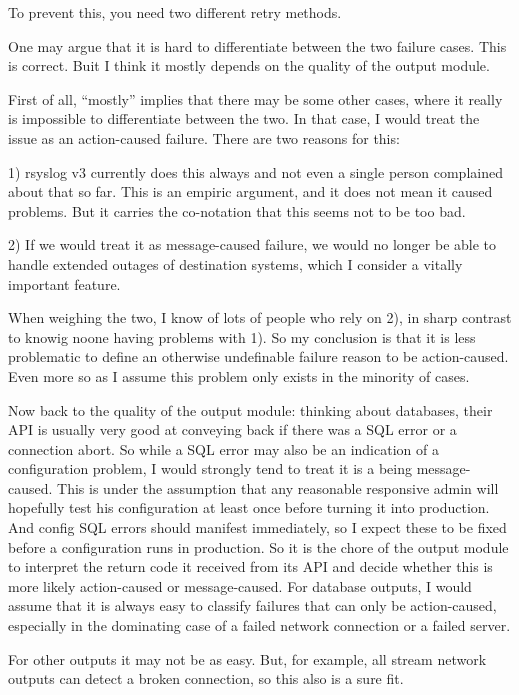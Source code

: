 \documentclass[a4paper,10pt]{article}
\begin{document}
To prevent this, you need two different retry methods.

One may argue that it is hard to differentiate between the two failure cases. This is correct. Buit I think it mostly depends on the quality of the output module. 

First of all, ``mostly'' implies that there may be some other cases, where it
really is impossible to differentiate between the two. In that case, I would
treat the issue as an action-caused failure. There are two reasons for this:

1) rsyslog v3 currently does this always and not even a single person
complained about that so far. This is an empiric argument, and it does not
mean it caused problems. But it carries the co-notation that this seems not
to be too bad.

2) If we would treat it as message-caused failure, we would no longer be able
to handle extended outages of destination systems, which I consider a vitally
important feature.

When weighing the two, I know of lots of people who rely on 2), in sharp
contrast to knowig noone having problems with 1). So my conclusion is that it is
less problematic to define an otherwise undefinable failure reason to be
action-caused. Even more so as I assume this problem only exists in the
minority of cases.

Now back to the quality of the output module: thinking about databases, their
API is usually very good at conveying back if there was a SQL error or a
connection abort. So while a SQL error may also be an indication of a
configuration problem, I would strongly tend to treat it is a being
message-caused. This is under the assumption that any reasonable responsive
admin will hopefully test his configuration at least once before turning it
into production. And config SQL errors should manifest immediately, so I
expect these to be fixed before a configuration runs in production. So it is
the chore of the output module to interpret the return code it received from
its API and decide whether this is more likely action-caused or
message-caused. For database outputs, I would assume that it is always easy
to classify failures that can only be action-caused, especially in the
dominating case of a failed network connection or a failed server.

For other outputs it may not be as easy. But, for example, all stream network
outputs can detect a broken connection, so this also is a sure fit.
\end{document}
